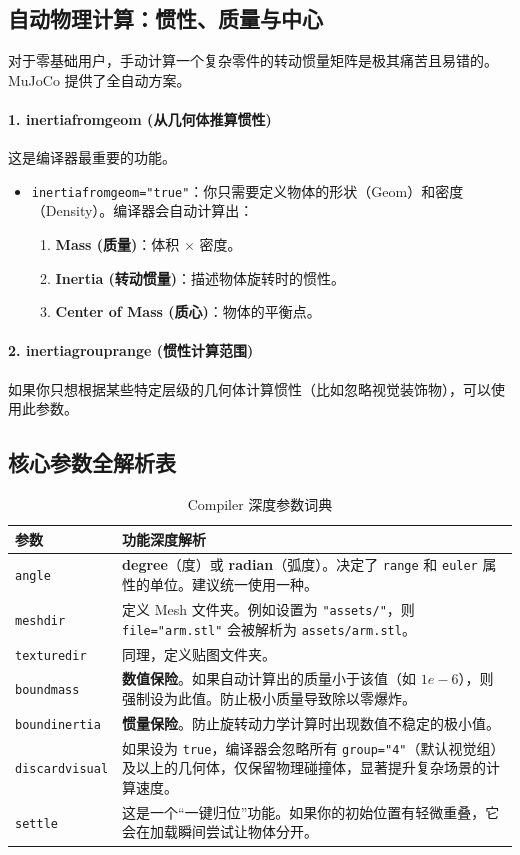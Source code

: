 \documentclass[11pt,a4paper]{book}
\begin{document}
\subsection{自动物理计算：惯性、质量与中心}
对于零基础用户，手动计算一个复杂零件的转动惯量矩阵是极其痛苦且易错的。MuJoCo 提供了全自动方案。

\paragraph{1. inertiafromgeom (从几何体推算惯性)}
这是编译器最重要的功能。
\begin{itemize}
    \item \texttt{inertiafromgeom="true"}：你只需要定义物体的形状（Geom）和密度（Density）。编译器会自动计算出：
    \begin{enumerate}
        \item \textbf{Mass (质量)}：体积 $\times$ 密度。
        \item \textbf{Inertia (转动惯量)}：描述物体旋转时的惯性。
        \item \textbf{Center of Mass (质心)}：物体的平衡点。
    \end{enumerate}
\end{itemize}

\paragraph{2. inertiagrouprange (惯性计算范围)}
如果你只想根据某些特定层级的几何体计算惯性（比如忽略视觉装饰物），可以使用此参数。

\subsection{核心参数全解析表}

\begin{longtable}{lp{10cm}}
\caption{Compiler 深度参数词典} \\
\toprule
\textbf{参数} & \textbf{功能深度解析} \\ \midrule
\texttt{angle} & \textbf{degree}（度）或 \textbf{radian}（弧度）。决定了 \texttt{range} 和 \texttt{euler} 属性的单位。建议统一使用一种。 \\
\texttt{meshdir} & 定义 Mesh 文件夹。例如设置为 \texttt{"assets/"}，则 \texttt{file="arm.stl"} 会被解析为 \texttt{assets/arm.stl}。 \\
\texttt{texturedir} & 同理，定义贴图文件夹。 \\
\texttt{boundmass} & \textbf{数值保险}。如果自动计算出的质量小于该值（如 $1e-6$），则强制设为此值。防止极小质量导致除以零爆炸。 \\
\texttt{boundinertia} & \textbf{惯量保险}。防止旋转动力学计算时出现数值不稳定的极小值。 \\
\texttt{discardvisual} & 如果设为 \texttt{true}，编译器会忽略所有 \texttt{group="4"}（默认视觉组）及以上的几何体，仅保留物理碰撞体，显著提升复杂场景的计算速度。 \\
\texttt{settle} & 这是一个“一键归位”功能。如果你的初始位置有轻微重叠，它会在加载瞬间尝试让物体分开。 \\
\bottomrule
\end{longtable}
\end{document}
